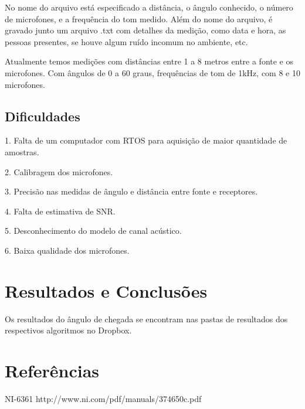 \documentclass[a4paper,oneside,12pt]{article}
\begin{document}
No nome do arquivo está especificado a distância, o ângulo conhecido, o número de microfones, e a frequência do tom medido. Além do nome do arquivo, é gravado junto um arquivo .txt com detalhes da medição, como data e hora, as pessoas presentes, se houve algum ruído incomum no ambiente, etc.

Atualmente temos medições com distâncias entre 1 a 8 metros entre a fonte e os microfones. Com ângulos de 0 a 60 graus, frequências de tom de 1kHz, com 8 e 10 microfones.

\subsection{Dificuldades}

1. Falta de um computador com RTOS para aquisição de maior quantidade de amostras.

2. Calibragem dos microfones.

3. Precisão nas medidas de ângulo e distância entre fonte e receptores.

4. Falta de estimativa de SNR.

5. Desconhecimento do modelo de canal acústico.

6. Baixa qualidade dos microfones.

\section{Resultados e Conclusões}

Os resultados do ângulo de chegada se encontram nas pastas de resultados dos respectivos algoritmos no Dropbox.

\pagebreak

\section{Referências}

NI-6361 http://www.ni.com/pdf/manuals/374650c.pdf



%
%
\end{document}
